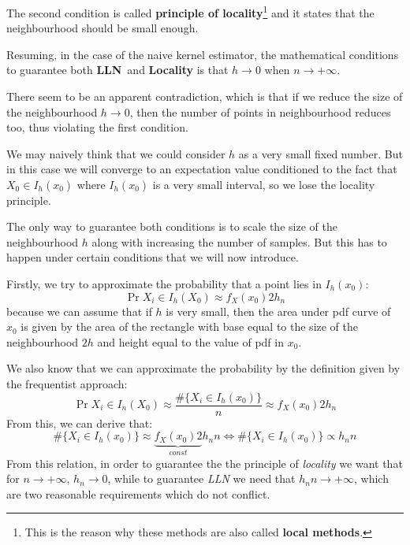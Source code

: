 The second condition is called \textbf{principle of locality}\footnote{This is the reason why these methods are also called \textbf{local methods}.} and it states that the neighbourhood should be small enough. 

Resuming, in the case of the naive kernel estimator, the mathematical conditions to guarantee both \textbf{LLN} and \textbf{Locality} is that $h \to 0$ when $n \to +\infty$.

There seem to be an apparent contradiction, which is that if we reduce the size of the neighbourhood $h \to 0$, then the number of points in neighbourhood reduces too, thus violating the first condition.

We may naively think that we could consider $h$ as a very small fixed number. But in this case we will converge to an expectation value conditioned to the fact that $X_0\in I_h(x_0)$ where $I_h(x_0)$ is a very small interval, so we lose the locality principle.

The only way to guarantee both conditions is to scale the size of the neighbourhood $h$ along with increasing the number of samples. But this has to happen under certain conditions that we will now introduce.

Firstly, we try to approximate the probability that a point lies in $I_h(x_0)$:
\[
    \Pr{X_i \in I_h(X_0)} \approx f_X(x_0) 2 h_n
\]
because we can assume that if $h$ is very small, then the area under pdf curve of $x_0$ is given by the area of the rectangle with base equal to the size of the neighbourhood $2h$ and height equal to the value of pdf in $x_0$. 
\begin{figure}
    \centering
\end{figure}
We also know that we can approximate the probability by the definition given by the frequentist approach:
\[
    \Pr{X_i \in I_n(X_0)} \approx \frac{\#\{X_i \in I_h(x_0)\}}{n} \approx f_X(x_0) 2 h_n
\]
From this, we can derive that:
\[
    \#\{X_i \in I_h(x_0)\} \approx \underbrace{f_X(x_0) 2}_{const} h_n n \iff \#\{X_i \in I_h(x_0)\} \propto h_n n
\]
From this relation, in order to guarantee the the principle of \textit{locality} we want that for $n \to +\infty$, $h_n \to 0$, while to guarantee \textit{LLN} we need that $h_n n \to +\infty$, which are two reasonable requirements which do not conflict. %

